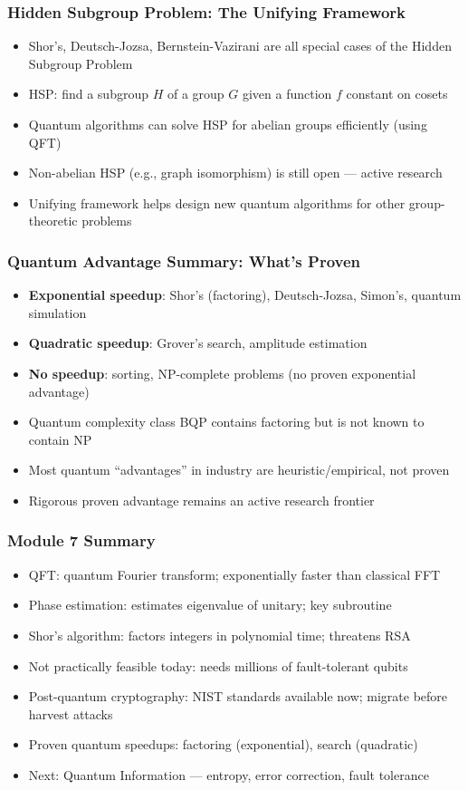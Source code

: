 \begin{frame}[fragile]\frametitle{Hidden Subgroup Problem: The Unifying Framework}
\begin{itemize}
\item Shor's, Deutsch-Jozsa, Bernstein-Vazirani are all special cases of the Hidden Subgroup Problem
\item HSP: find a subgroup $H$ of a group $G$ given a function $f$ constant on cosets
\item Quantum algorithms can solve HSP for abelian groups efficiently (using QFT)
\item Non-abelian HSP (e.g., graph isomorphism) is still open --- active research
\item Unifying framework helps design new quantum algorithms for other group-theoretic problems
\end{itemize}
\end{frame}

\begin{frame}[fragile]\frametitle{Quantum Advantage Summary: What's Proven}
\begin{itemize}
\item \textbf{Exponential speedup}: Shor's (factoring), Deutsch-Jozsa, Simon's, quantum simulation
\item \textbf{Quadratic speedup}: Grover's search, amplitude estimation
\item \textbf{No speedup}: sorting, NP-complete problems (no proven exponential advantage)
\item Quantum complexity class BQP contains factoring but is not known to contain NP
\item Most quantum ``advantages'' in industry are heuristic/empirical, not proven
\item Rigorous proven advantage remains an active research frontier
\end{itemize}
\end{frame}

\begin{frame}[fragile]\frametitle{Module 7 Summary}
\begin{itemize}
\item QFT: quantum Fourier transform; exponentially faster than classical FFT
\item Phase estimation: estimates eigenvalue of unitary; key subroutine
\item Shor's algorithm: factors integers in polynomial time; threatens RSA
\item Not practically feasible today: needs millions of fault-tolerant qubits
\item Post-quantum cryptography: NIST standards available now; migrate before harvest attacks
\item Proven quantum speedups: factoring (exponential), search (quadratic)
\item Next: Quantum Information --- entropy, error correction, fault tolerance
\end{itemize}
\end{frame}
